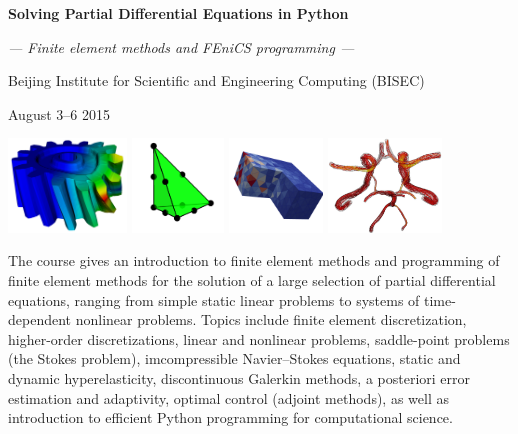 \documentclass[10pt]{article}
\begin{document}
\null
\vspace{-2.5cm}

\begin{center}
  \bf
  \LARGE
  Solving Partial Differential Equations in Python

  \bigskip

  \emph{--- Finite element methods and FEniCS programming ---}

  \bigskip

  \Large
  Beijing Institute for Scientific and Engineering Computing (BISEC)

  \smallskip

  August 3--6 2015


\end{center}

\smallskip

\begin{center}
  \includegraphics[height=2.5cm]{pdf/elasticity.pdf}
  \includegraphics[height=2.5cm]{png/CG2_3d.png}
  \includegraphics[height=2.5cm]{png/poisson_picture.png}
  \includegraphics[height=2.5cm]{png/circle_of_willis_simulation.png}
\end{center}

The course gives an introduction to finite element methods and
programming of finite element methods for the solution of a large
selection of partial differential equations, ranging from simple static
linear problems to systems of time-dependent nonlinear problems.
Topics include finite element discretization, higher-order
discretizations, linear and nonlinear problems, saddle-point problems
(the Stokes problem), imcompressible Navier--Stokes equations, static
and dynamic hyperelasticity, discontinuous Galerkin methods, a
posteriori error estimation and adaptivity, optimal control (adjoint
methods), as well as introduction to efficient Python programming for
computational science.
\end{document}
